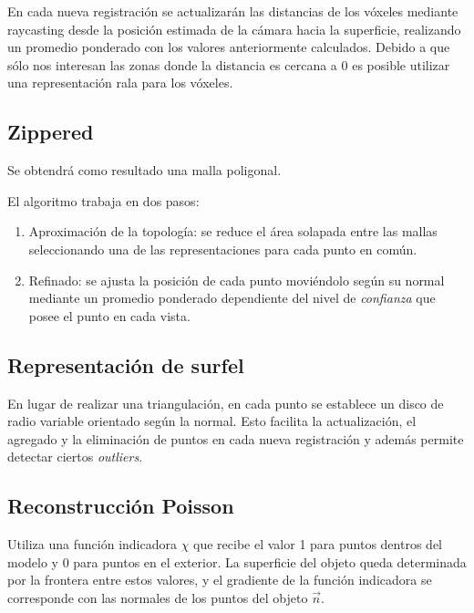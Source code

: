 \documentclass{pfc}
\begin{document}
		En cada nueva registración se actualizarán las distancias de los
		vóxeles mediante raycasting
		desde la posición estimada de la cámara hacia la superficie,
		realizando un promedio ponderado con los valores anteriormente calculados.\cite{Curless:1996:VMB:237170.237269} %
		Debido a que sólo nos interesan las zonas donde la distancia es cercana a 0 es posible utilizar una representación rala para los vóxeles.\cite{Steinbrucker:2013:LMS:2586117.2586926} %


		\subsection{Zippered}
		Se obtendrá como resultado una malla poligonal.

		El algoritmo trabaja en dos pasos:
		\begin{enumerate}
			\item Aproximación de la topología: se reduce el área solapada
				entre las mallas seleccionando una de las representaciones para
				cada punto en común.
			\item Refinado: se ajusta la posición de cada punto moviéndolo
				según su normal mediante un promedio ponderado dependiente del
				nivel de \emph{confianza} que posee el punto en cada vista.\cite{Turk:1994:ZPM:192161.192241}
		\end{enumerate}

		\subsection{Representación de surfel}
		En lugar de realizar una triangulación, en cada punto se establece un disco de radio variable orientado según la normal.
		Esto facilita la actualización, el agregado y la eliminación de puntos en cada nueva registración y además permite detectar ciertos \emph{outliers}.\cite{5457479}

		\subsection{Reconstrucción Poisson}
		Utiliza una función indicadora $\chi$ que recibe el valor 1 para puntos
		dentros del modelo y 0 para puntos en el exterior.
		La superficie del objeto queda determinada por la frontera entre estos
		valores, y el gradiente de la función indicadora se corresponde con las
		normales de los puntos del objeto $\vec{n}$.
\end{document}
